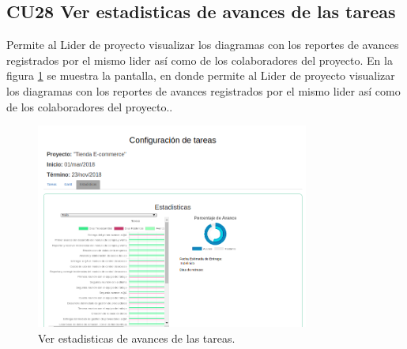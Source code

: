 \subsection{CU28 Ver estadisticas de avances de las tareas}
{
\justify
{}
}

\justify
Permite al Lider de proyecto visualizar los diagramas con los reportes de avances registrados por el mismo lider así como de los colaboradores del proyecto.
{
\justify
{}
}
\justify
En la figura \ref{fig:IU28} se muestra la pantalla, en donde permite al Lider de proyecto visualizar los diagramas con los reportes de avances registrados por el mismo lider así como de los colaboradores del proyecto..

\begin{figure}[htb]
\centering
\includegraphics[width=0.8\textwidth]{./images/cu28-ver-estadisticas-avances-tareas.png}
\caption{Ver estadisticas de avances de las tareas.} \label{fig:IU28}
\end{figure}